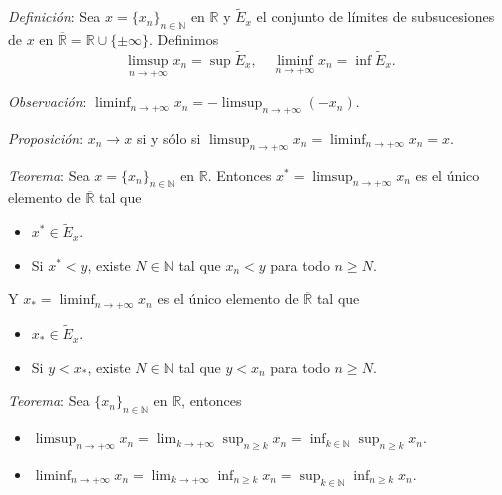 \documentclass{beamer}
\begin{document}
  \begin{frame}
    \textit{Definición}: Sea $x = \{x_n\}_{n \in \mathbb{N}}$ en $\mathbb{R}$ y
    $\tilde{E}_x$ el conjunto de límites de subsucesiones de $x$ en
    $\overline{\mathbb{R}} = \mathbb{R} \cup \{\pm\infty\}$. Definimos
    \[
      \limsup_{n \to +\infty} x_n = \sup \tilde{E}_x, \quad
      \liminf_{n \to +\infty} x_n = \inf \tilde{E}_x.
    \]
    \pause

    \textit{Observación}:
    $\liminf_{n \to +\infty} x_n = -\limsup_{n \to +\infty} (-x_n)$.
    \newline\newline
    \pause

    \textit{Proposición}: $x_n \to x$ si y sólo si
    $\limsup_{n \to +\infty} x_n = \liminf_{n \to +\infty} x_n = x$.
  \end{frame}

  \begin{frame}
    \textit{Teorema}: Sea $x = \{x_n\}_{n \in \mathbb{N}}$ en $\mathbb{R}$. Entonces
    $x^* = \limsup_{n \to +\infty} x_n$ es el único elemento de
    $\overline{\mathbb{R}}$ tal que
    \pause
    \begin{itemize}[<+->]
      \item $x^* \in \tilde{E}_x$.
      \item Si $x^* < y$, existe $N \in \mathbb{N}$ tal que $x_n < y$ para todo
      $n \geq N$.
    \end{itemize}
    \pause
    Y $x_* = \liminf_{n \to +\infty} x_n$ es el único elemento de
    $\overline{\mathbb{R}}$ tal que
    \pause
    \begin{itemize}[<+->]
      \item $x_* \in \tilde{E}_x$.
      \item Si $y < x_*$, existe $N \in \mathbb{N}$ tal que $y < x_n$ para todo
      $n \geq N$.
    \end{itemize}
  \end{frame}

  \begin{frame}
    \textit{Teorema}: Sea $\{x_n\}_{n \in \mathbb{N}}$ en $\mathbb{R}$, entonces
    \pause
    \begin{itemize}[<+->]
      \item $\limsup_{n \to +\infty} x_n = \lim_{k \to +\infty} \sup_{n \geq k} x_n
      = \inf_{k \in \mathbb{N}} \sup_{n \geq k} x_n$.
      \item $\liminf_{n \to +\infty} x_n = \lim_{k \to +\infty} \inf_{n \geq k} x_n
      = \sup_{k \in \mathbb{N}} \inf_{n \geq k} x_n$.
    \end{itemize}
  \end{frame}
\end{document}
